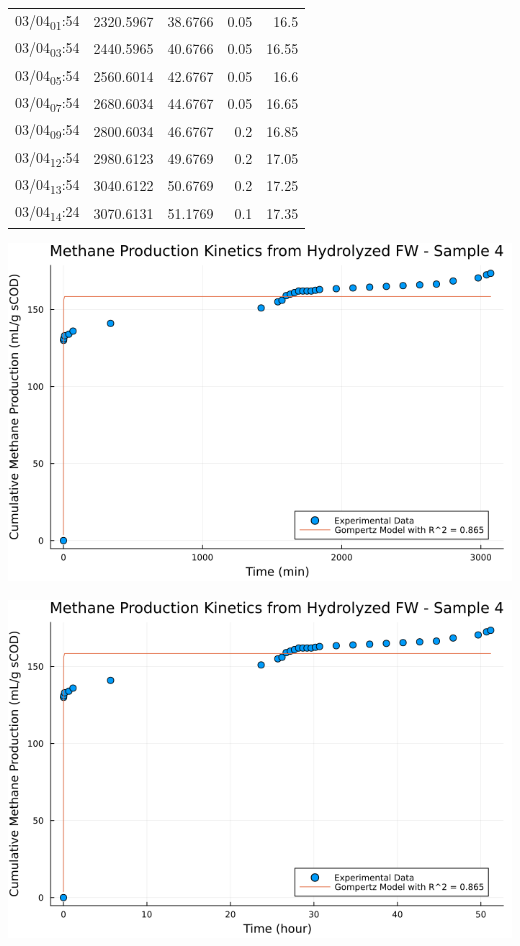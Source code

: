 \documentclass[11pt]{article}
\begin{document}
\begin{center}
\begin{tabular}{lrrrr}
03/04\textsubscript{01}:54 & 2320.5967 & 38.6766 & 0.05 & 16.5\\[0pt]
03/04\textsubscript{03}:54 & 2440.5965 & 40.6766 & 0.05 & 16.55\\[0pt]
03/04\textsubscript{05}:54 & 2560.6014 & 42.6767 & 0.05 & 16.6\\[0pt]
03/04\textsubscript{07}:54 & 2680.6034 & 44.6767 & 0.05 & 16.65\\[0pt]
03/04\textsubscript{09}:54 & 2800.6034 & 46.6767 & 0.2 & 16.85\\[0pt]
03/04\textsubscript{12}:54 & 2980.6123 & 49.6769 & 0.2 & 17.05\\[0pt]
03/04\textsubscript{13}:54 & 3040.6122 & 50.6769 & 0.2 & 17.25\\[0pt]
03/04\textsubscript{14}:24 & 3070.6131 & 51.1769 & 0.1 & 17.35\\[0pt]
\end{tabular}
\end{center}

\begin{center}
\includegraphics[width=.9\linewidth]{../plots/BMPs/Hydrolyzed FW/methane_kinetics_hydrolysate_4_min.png}
\end{center}

\begin{center}
\includegraphics[width=.9\linewidth]{../plots/BMPs/Hydrolyzed FW/methane_kinetics_hydrolysate_4_hour.png}
\end{center}
\end{document}
